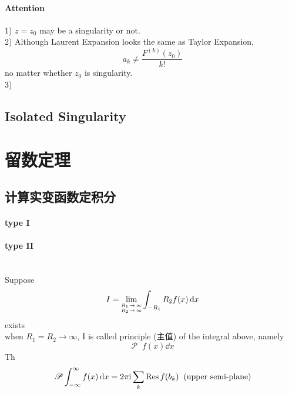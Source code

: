 \documentclass[UTF8]{ctexart} %
\DeclareMathOperator{\intdinf}{\int_{-\infty}^\infty}
\renewcommand{\I}{\mathrm{i}}
\DeclareMathOperator{\ra}{\rightarrow}
\numberwithin{equation}{section}
\begin{document}
\paragraph{Attention}
1) $z=z_0$ may be a singularity or not.\\
2) Although Laurent Expansion looks the same as Taylor Expansion,
\begin{equation}\label{key}
a_k \neq \dfrac{F^{(k)}(z_0)}{k!}
\end{equation}
no matter whether $z_0$ is singularity.\\
3) \\

\subsection{Isolated Singularity}

\section{留数定理}
\subsection{}
\subsection{计算实变函数定积分}
\paragraph{type I}
\paragraph{type II}~\\
Suppose
\begin{equation}\label{key}
I = \lim_{\tiny\mqty{R_1\ra\infty\\R_2\ra\infty}} \int_{-R_1}{R_2} f(x)\dd{x}
\end{equation}
exists\\
when $R_1 = R_2 \ra \infty$, I is called principle (主值) of the integral above, namely
\begin{equation}\label{key}
\mathscr{P}\intdinf f(x)\dd{x}
\end{equation}
Th\\
\begin{equation}\label{key}
\mathscr{P}\intdinf f(x)\dd{x} = 2\pi\I\sum_{k} \Res f(b_k)\;\;\text{(upper semi-plane)}
\end{equation}
\end{document}

